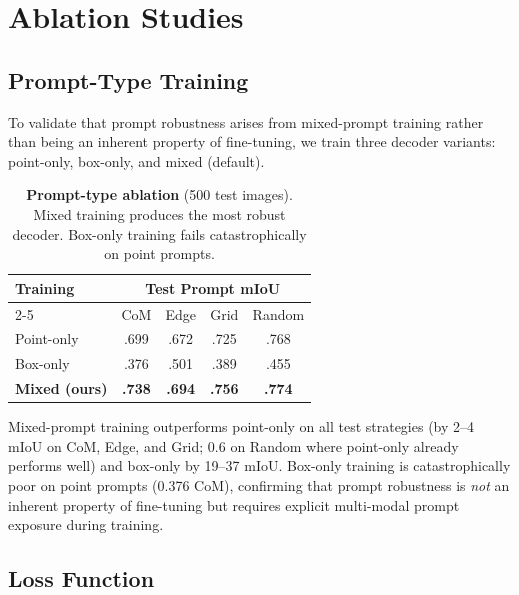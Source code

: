 \section{Ablation Studies}

\subsection{Prompt-Type Training}
\label{sec:ablation_prompt}

To validate that prompt robustness arises from mixed-prompt training rather than being an inherent property of fine-tuning, we train three decoder variants: point-only, box-only, and mixed (default).

\begin{table}[t]
\centering
\caption{\textbf{Prompt-type ablation} (500 test images). Mixed training produces the most robust decoder. Box-only training fails catastrophically on point prompts.}
\label{tab:ablation_prompt}
\small
\begin{tabular}{lcccc}
\toprule
\multirow{2}{*}{Training} & \multicolumn{4}{c}{Test Prompt mIoU} \\
\cmidrule(lr){2-5}
 & CoM & Edge & Grid & Random \\
\midrule
Point-only & .699 & .672 & .725 & .768 \\
Box-only & .376 & .501 & .389 & .455 \\
\textbf{Mixed (ours)} & \textbf{.738} & \textbf{.694} & \textbf{.756} & \textbf{.774} \\
\bottomrule
\end{tabular}
\end{table}

Mixed-prompt training outperforms point-only on all test strategies (by 2--4 mIoU on CoM, Edge, and Grid; 0.6 on Random where point-only already performs well) and box-only by 19--37 mIoU. Box-only training is catastrophically poor on point prompts (0.376 CoM), confirming that prompt robustness is \emph{not} an inherent property of fine-tuning but requires explicit multi-modal prompt exposure during training.

\subsection{Loss Function}


